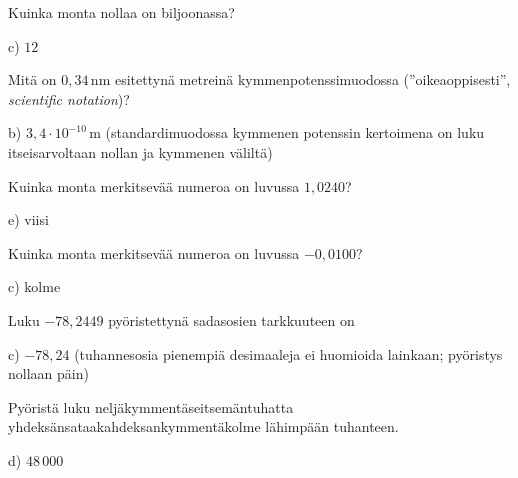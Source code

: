 \begin{multicols}{2}
\begin{tehtava}
Kuinka monta nollaa on biljoonassa?
\begin{vastaus}
c) $12$
\end{vastaus}
\end{tehtava}

\begin{tehtava}
Mitä on $0,34$\,nm esitettynä metreinä kymmenpotenssimuodossa (''oikeaoppisesti'', \textit{scientific notation})?
\begin{vastaus}
b) $3,4 \cdot 10^{-10}$\,m (standardimuodossa kymmenen potenssin kertoimena on luku itseisarvoltaan nollan ja kymmenen väliltä)
\end{vastaus}
\end{tehtava}

\begin{tehtava}
Kuinka monta merkitsevää numeroa on luvussa $1,0240$?
\begin{vastaus}
e) viisi
\end{vastaus}
\end{tehtava}

\begin{tehtava}
Kuinka monta merkitsevää numeroa on luvussa $-0,0100$?
\begin{vastaus}
c) kolme
\end{vastaus}
\end{tehtava}

\begin{tehtava}
Luku $-78,2449$ pyöristettynä sadasosien tarkkuuteen on
\begin{vastaus}
c) $-78,24$ (tuhannesosia pienempiä desimaaleja ei huomioida lainkaan; pyöristys nollaan päin)
\end{vastaus}
\end{tehtava}

\begin{tehtava}
Pyöristä luku neljäkymmentäseitsemäntuhatta yhdeksänsataakahdeksankymmentäkolme lähimpään tuhanteen.
\begin{vastaus}
d) $48\,000$
\end{vastaus}
\end{tehtava}


\end{multicols}
